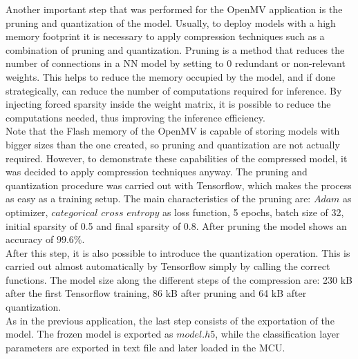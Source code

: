 \documentclass[12pt]{report}
\begin{document}
Another important step that was performed for the OpenMV application is the pruning and quantization of the model. Usually, to deploy models with a high memory footprint it is necessary to apply compression techniques such as a combination of pruning and quantization.
Pruning is a method that reduces the number of connections in a NN model by setting to 0 redundant or non-relevant weights. This helps to reduce the memory occupied by the model, and if done strategically, can reduce the number of computations required for inference. By injecting forced sparsity inside the weight matrix, it is possible to reduce the computations needed, thus improving the inference efficiency. \\
Note that the Flash memory of the OpenMV is capable of storing models with bigger sizes than the one created, so pruning and quantization are not actually required. However, to demonstrate these capabilities of the compressed model, it was decided to apply compression techniques anyway. The pruning and quantization procedure was carried out with Tensorflow, which makes the process as easy as a training setup. The main characteristics of the pruning are: $Adam$ as optimizer, $categorical$ $cross$ $entropy$ as loss function, 5 epochs, batch size of 32, initial sparsity of 0.5 and final sparsity of 0.8. After pruning the model shows an accuracy of $99.6\%$.\\
After this step, it is also possible to introduce the quantization operation. This is carried out almost automatically by Tensorflow simply by calling the correct functions. The model size along the different steps of the compression are: 230 kB after the first Tensorflow training, 86 kB after pruning and 64 kB after quantization. \\
As in the previous application, the last step consists of the exportation of the model. The frozen model is exported as $model.h5$, while the classification layer parameters are exported in text file and later loaded in the MCU. 
\end{document}
